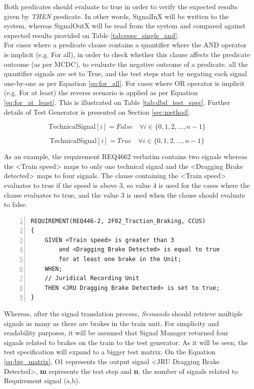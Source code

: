 Both predicates should evaluate to true in order to verify the expected results given by \textit{THEN} predicate. In other words, SignalInX will be written to the system, whereas SignalOutX will be read from the system and compared against expected results provided on Table \ref{tab:spec_single_and}.\\

For cases where a predicate clause contains a quantifier where the AND operator is implicit (e.g. For all), in order to check whether this clause affects the predicate outcome (as per MCDC), to evaluate the negative outcome of a predicate. all the quantifier signals are set to True, and the test steps start by negating each signal one-by-one as per Equation \ref{eq:for_all}. For cases where OR operator is implicit (e.g. For at least) the reverse scenario is applied as per Equation \ref{eq:for_at_least}. This is illustrated on Table \ref{tab:dbd_test_spec}. Further details of Test Generator is presented on Section \ref{sec:method}.

\begin{equation} \label{eq:for_all}
    \text{TechnicalSignal}[i] = False \quad \forall i \in \{0, 1, 2, \dots , n-1\}
\end{equation}

\begin{equation} \label{eq:for_at_least}
    \text{TechnicalSignal}[i] = True \quad \forall i \in \{0, 1, 2, \dots , n-1\}
\end{equation}

As an example, the requirement REQ4662 verbatim contains two signals whereas the <Train speed> maps to only one technical signal and the <Dragging Brake detected> maps to four signals. The clause containing the <Train speed> evaluates to true if the speed is above 3, so value 4 is used for the cases where the clause evaluates to true, and the value 3 is used when the clause should evaluate to false.

\begin{Verbatim}[xleftmargin=12mm, numbers=left]
REQUIREMENT(REQ446-2, 2F02_Traction_Braking, CCUS)
{
	GIVEN <Train speed> is greater than 3
	    and <Dragging Brake Detected> is equal to true 
	    for at least one brake in the Unit;
	WHEN;
	// Juridical Recording Unit
	THEN <JRU Dragging Brake Detected> is set to true;
}
\end{Verbatim}


Whereas, after the signal translation process, \textit{Sesnando} should retrieve multiple signals as many as there are brakes in the train unit. For simplicity and readability purposes, it will be assumed that Signal Manager returned four signals related to brakes on the train to the test generator. As it will be seen, the test specification will expand to a bigger test matrix. On the Equation \ref{eq:big_matrix}, O1 represents the output signal <JRU Dragging Brake Detected>, \textbf{m} represents the test step and \textbf{n}, the number of signals related to Requirement signal (a,b).

